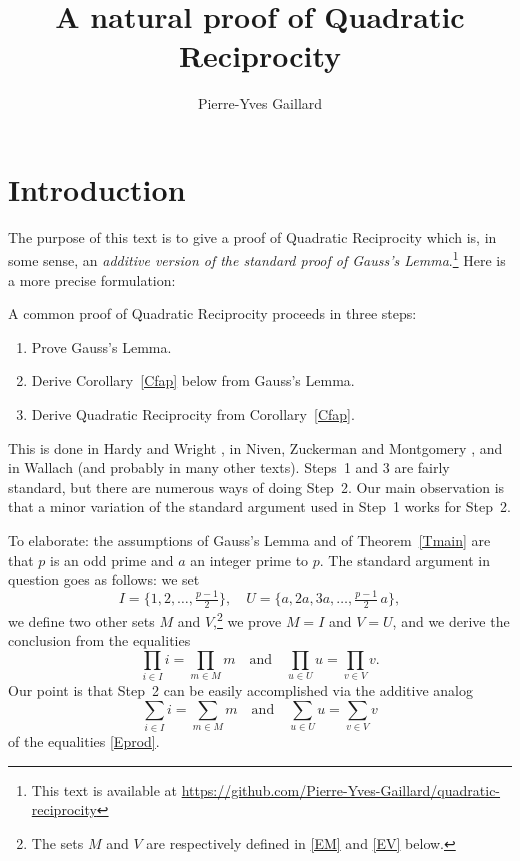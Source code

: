 \documentclass[12pt,letterpaper]{article}
\title{A natural proof of Quadratic Reciprocity} \author{Pierre-Yves Gaillard} \date{}
\begin{document}

\maketitle

\section{Introduction}%

The purpose of this text is to give a proof of Quadratic Reciprocity which is, in some sense, an \emph{additive version of the standard proof of Gauss's Lemma}.\footnote{This text is available at \url{https://github.com/Pierre-Yves-Gaillard/quadratic-reciprocity}} Here is a more precise formulation: 

A common proof of Quadratic Reciprocity proceeds in three steps: 
\begin{enumerate}
\item Prove Gauss's Lemma. 
\item Derive Corollary~\ref{Cfap} below from Gauss's Lemma. 
\item Derive Quadratic Reciprocity from Corollary~\ref{Cfap}. 
\end{enumerate} 
This is done in Hardy and Wright \cite{hardy2008introduction}, in Niven, Zuckerman and Montgomery \cite{niven1991introduction}, and in Wallach \cite{wallach} (and probably in many other texts). Steps~1 and 3 are fairly standard, but there are numerous ways of doing Step~2. Our main observation is that a minor variation of the standard argument used in Step~1 works for Step~2. 

To elaborate: the assumptions of Gauss's Lemma and of Theorem~\ref{Tmain} are that \(p\) is an odd prime and \(a\) an integer prime to \(p\). The standard argument in question goes as follows: we set 
\begin{equation}\label{EIU}
I=\{1,2,\ldots,\tfrac{p-1}2\},\quad U=\{a,2a,3a,\ldots,\tfrac{p-1}2\,a\},
\end{equation} 
we define two other sets \(M\) and \(V\),\footnote{The sets \(M\) and \(V\) are respectively defined in \eqref{EM} and \eqref{EV} below.} we prove \(M=I\) and \(V=U\), and we derive the conclusion from the equalities 
\begin{equation}\label{Eprod}
\prod_{i\in I}i=\prod_{m\in M}m\quad\text{and}\quad\prod_{u\in U}u=\prod_{v\in V}v.
\end{equation} 
Our point is that Step~2 can be easily accomplished via the additive analog 
\begin{equation}\label{Esum} 
\sum_{i\in I}i=\sum_{m\in M}m\quad\text{and}\quad\sum_{u\in U}u=\sum_{v\in V}v
\end{equation} 
of the equalities \eqref{Eprod}. 
\end{document}
